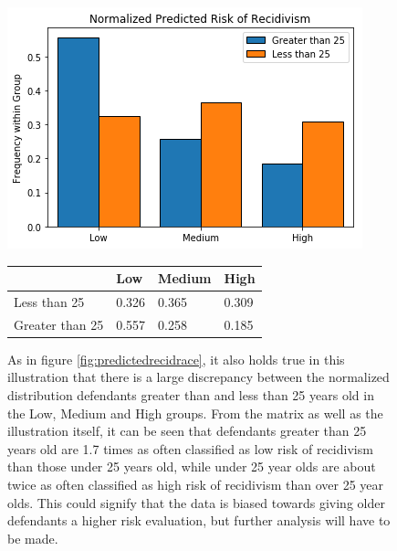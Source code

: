 \documentclass[11pt, fleqn, titlepage]{article}
\begin{document}
	
	\begin{figure}[H]
		\centering
		\includegraphics[width=0.5\linewidth]{imgs/normalized_recid_age}	
		\begin{table}[H]
			\centering
			\begin{tabular}{|l|l|l|l|}
				\hline
				& Low   & Medium & High  \\ \hline
				Less than 25    & 0.326 & 0.365  & 0.309 \\ \hline
				Greater than 25 & 0.557 & 0.258  & 0.185 \\ \hline
			\end{tabular}
		\end{table}
		\caption{As in figure \ref{fig:predictedrecidrace}, it also holds true in this illustration that there is a large discrepancy between the normalized distribution defendants greater than and less than 25 years old in the Low, Medium and High groups. From the matrix as well as the illustration itself, it can be seen that defendants greater than 25 years old are 1.7 times as often classified as low risk of recidivism than those under 25 years old, while under 25 year olds are about twice as often classified as high risk of recidivism than over 25 year olds. This could signify that the data is biased towards giving older defendants a higher risk evaluation, but further analysis will have to be made.}
		\label{fig:predictedrecidage}
	\end{figure}
	
\end{document}
